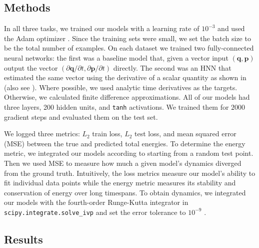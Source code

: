 \documentclass{article}
\begin{document}
\subsection{Methods} In all three tasks, we trained our models with a learning rate of $10^{-3}$ and used the Adam optimizer \cite{Kingma2014Adam}. Since the training sets were small, we set the batch size to be the total number of examples. On each dataset we trained two fully-connected neural networks: the first was a baseline model that, given a vector input $(\mathbf{q},\mathbf{p})$ output the vector $(\partial \mathbf{q}/{\partial t}, \partial\mathbf{p}/\partial t)$ directly. The second was an HNN that estimated the same vector using the derivative of a scalar quantity as shown in  (also see ).
Where possible, we used analytic time derivatives as the targets. Otherwise, we calculated finite difference approximations. All of our models had three layers, 200 hidden units, and \texttt{tanh} activations. We trained them for $2000$ gradient steps and evaluated them on the test set.

We logged three metrics: $L_2$ train loss, $L_2$ test loss, and mean squared error (MSE) between the true and predicted total energies. To determine the energy metric, we integrated our models according to  starting from a random test point. Then we used MSE to measure how much a given model's dynamics diverged from the ground truth. Intuitively, the loss metrics measure our model's ability to fit individual data points while the energy metric measures its stability and conservation of energy over long timespans. To obtain dynamics, we integrated our models with the fourth-order Runge-Kutta integrator in \texttt{scipy.integrate.solve\_ivp} and set the error tolerance to $10^{-9}$ \cite{runge-1895-uber-die-numerische-auflosung}.



\subsection{Results}
\end{document}
